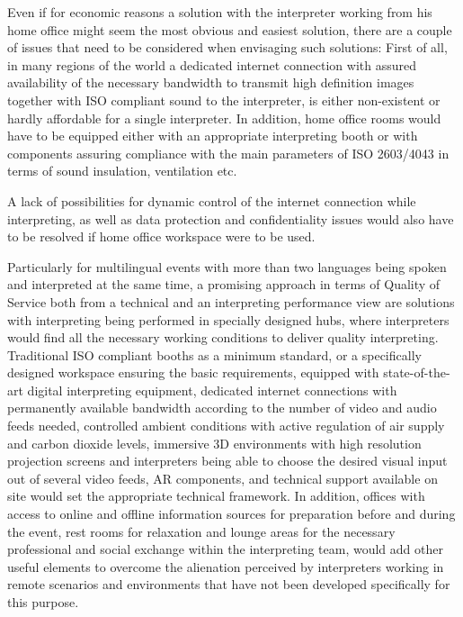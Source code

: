 \documentclass[output=paper]{langsci/langscibook}
\begin{document}
Even if for economic reasons a solution with the interpreter working from his home office might seem the most obvious and easiest solution, there are a couple of issues that need to be considered when envisaging such solutions: First of all, in many regions of the world a dedicated internet connection with assured availability of the necessary bandwidth to transmit high definition images together with \textsc{ISO} compliant sound to the interpreter, is either non-existent or hardly affordable for a single interpreter. In addition, home office rooms would have to be equipped either with an appropriate interpreting booth or with components assuring compliance with the main parameters of \textsc{ISO} 2603/4043 in terms of sound insulation, ventilation etc.

A lack of possibilities for dynamic control of the internet connection while interpreting, as well as data protection and confidentiality issues would also have to be resolved if home office workspace were to be used.

Particularly for multilingual events with more than two languages being spoken and interpreted at the same time, a promising approach in terms of Quality of Service both from a technical and an interpreting performance view are solutions with interpreting being performed in specially designed hubs, where interpreters would find all the necessary working conditions to deliver quality interpreting. Traditional \textsc{ISO} compliant booths as a minimum standard, or a specifically designed workspace ensuring the basic requirements, equipped with state-of-the-art digital interpreting equipment, dedicated internet connections with permanently available bandwidth according to the number of video and audio feeds needed, controlled ambient conditions with active regulation of air supply and carbon dioxide levels, immersive 3D environments with high resolution projection screens and interpreters being able to choose the desired visual input out of several video feeds, \textsc{AR} components, and technical support available on site would set the appropriate technical framework. In addition, offices with access to online and offline information sources for preparation before and during the event, rest rooms for relaxation and lounge areas for the necessary professional and social exchange within the interpreting team, would add other useful elements to overcome the alienation perceived by interpreters working in remote scenarios and environments that have not been developed specifically for this purpose. 
\end{document}
